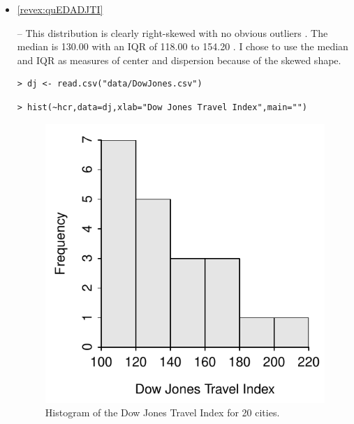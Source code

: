 \documentclass[10pt,openany]{book}\usepackage[]{graphicx}\usepackage[]{color}
\makeatletter
\newenvironment{kframe}{%
 \def\at@end@of@kframe{}%
 \ifinner\ifhmode%
  \def\at@end@of@kframe{\end{minipage}}%
  \begin{minipage}{\columnwidth}%
 \fi\fi%
 \def\FrameCommand##1{\hskip\@totalleftmargin \hskip-\fboxsep
 \colorbox{shadecolor}{##1}\hskip-\fboxsep
     \hskip-\linewidth \hskip-\@totalleftmargin \hskip\columnwidth}%
 \MakeFramed {\advance\hsize-\width
   \@totalleftmargin\z@ \linewidth\hsize
   \@setminipage}}%
 {\par\unskip\endMakeFramed%
 \at@end@of@kframe}
\newenvironment{knitrout}{}{} %
\makeatother
\begin{document}
\begin{itemize}
  \item \hypertarget{ans:quEDADJTI}{\ref{revex:quEDADJTI}} -- This distribution is clearly right-skewed with no obvious outliers .  The median is 130.00 with an IQR of 118.00 to 154.20 .  I chose to use the median and IQR as measures of center and dispersion because of the skewed shape.
\begin{knitrout}
\color{fgcolor}\begin{kframe}
\begin{verbatim}
> dj <- read.csv("data/DowJones.csv")
\end{verbatim}
\end{kframe}
\end{knitrout}
\begin{knitrout}
\color{fgcolor}\begin{kframe}
\begin{verbatim}
> hist(~hcr,data=dj,xlab="Dow Jones Travel Index",main="")
\end{verbatim}
\end{kframe}\begin{figure}[hbtp]

{\centering \includegraphics[width=.4\linewidth]{Figs/DJHist-1} 

}

\caption[Histogram of the Dow Jones Travel Index for 20 cities]{Histogram of the Dow Jones Travel Index for 20 cities.}\label{fig:DJHist}
\end{figure}



\end{knitrout}
\end{itemize}
\end{document}
